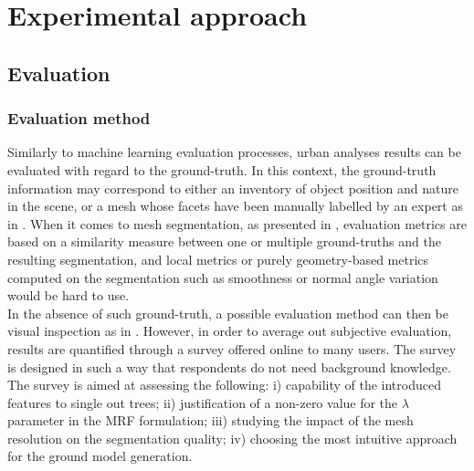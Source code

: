 \documentclass{kththesis}
\begin{document}
\section{Experimental approach}
\subsection{Evaluation}
\subsubsection{Evaluation method}
Similarly to machine learning evaluation processes, urban analyses results can be evaluated with regard to the ground-truth. In this context, the ground-truth information may correspond to either an inventory of object position and nature in the scene, or a mesh whose facets have been manually labelled by an expert as in \textcite{rouhani}. When it comes to mesh segmentation, as presented in \textcite{ComparativeStudyMetrics}, evaluation metrics are based on a similarity measure between one or multiple ground-truths and the resulting segmentation, and local metrics or purely geometry-based metrics computed on the segmentation such as smoothness or normal angle  variation would be hard to use. \\ 
In the absence of such ground-truth, a possible evaluation method can then be visual inspection as in \textcite{verdie}. However, in order to average out subjective evaluation, results are quantified through a survey offered online to many users. The survey is designed in such a way that respondents do not need background knowledge. The survey is aimed at assessing the following: i) capability of the introduced features to single out trees; ii) justification of a non-zero value for the $\lambda$ parameter in the MRF formulation; iii) studying the impact of the mesh resolution on the segmentation quality; iv) choosing the most intuitive approach for the ground model generation. 
\end{document}
